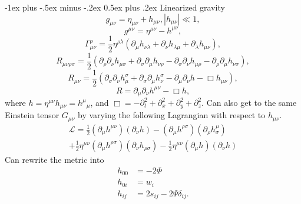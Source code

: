 \documentclass[10pt,landscape,a4paper]{article}
\makeatletter
\newcommand{\munu} {\mu\nu}
\renewcommand{\section}{\@startsection{section}{1}{0mm}%
                                {-1ex plus -.5ex minus -.2ex}%
                                {0.5ex plus .2ex}%
                                {\normalfont\large\bfseries}}
\makeatother
\begin{document}
\begin{multicols}{3}
\section{Linearized gravity}
\begin{equation}
g_{\munu} = \eta_{\munu} + h_{\munu} , |h_{\munu}| \ll 1,
\end{equation}
\begin{equation}
g^{\munu} = \eta^{\munu} - h^{\munu} ,
\end{equation}
\begin{equation}
\Gamma^\rho_{\munu} = \frac{1}{2}\eta^{\rho\lambda}(\partial_\mu h_{\nu\lambda} + \partial_\nu h_{\lambda\mu} + \partial_\lambda h_{\munu}),
\end{equation}
\begin{equation}
R_{\mu\nu\rho\sigma} = \frac{1}{2}(\partial_\rho\partial_\nu h_{\mu\sigma} + \partial_\sigma\partial_\mu h_{\nu\rho} -\partial_\sigma\partial_\nu h_{\mu\rho} - \partial_\rho\partial_\mu h_{\nu\sigma}),
\end{equation}
\begin{equation}
R_{\munu} = \frac{1}{2}(\partial_\sigma\partial_\nu h^\sigma_\mu + \partial_\sigma\partial_\mu h^\sigma_\nu - \partial_\mu\partial_\nu h - \Box h_{\munu}),
\end{equation}
\begin{equation}
R = \partial_\mu\partial_\nu h^{\munu} - \Box h,
\end{equation}
where $h = \eta^{\munu}h_{\munu} = h^\mu{}_\mu$, and $\Box = -\partial_t^2+\partial_x^2 +\partial_y^2 + \partial_z^2$.
Can also get to the same Einstein tensor $G_{\munu}$ by varying the following Lagrangian with respect to $h_{\munu}$.
\begin{equation}
\begin{split}
\mathcal{L} = \frac{1}{2}(\partial_\mu h^{\munu})(\partial_\nu h) -(\partial_\mu h^{\rho\sigma})
(\partial_\rho h^\mu_\sigma) \\
+\frac{1}{2}\eta^{\munu}(\partial_\mu h^{\rho\sigma})(\partial_\nu h_{\rho\sigma}) -\frac{1}{2}\eta^{\munu}(\partial_\mu h)(\partial_\nu h)
\end{split}
\end{equation}
Can rewrite the metric into 
\begin{equation}
\begin{split}
h_{00} &= -2\Phi\\
h_{0i} &= w_i\\
h_{ij} &= 2s_{ij} -2\Psi\delta_{ij}.\\

\end{split}
\end{equation}
\end{multicols}
\end{document}
